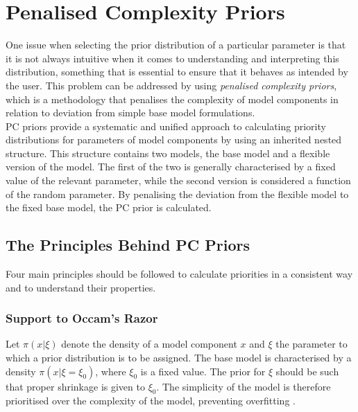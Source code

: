 \section{Penalised Complexity Priors}
One issue when selecting the prior distribution of a particular parameter is that it is not always intuitive when it comes to understanding and interpreting this distribution, something that is essential to ensure that it behaves as intended by the user. This problem can be addressed by using \textit{penalised complexity priors}, which is a methodology that penalises the complexity of model components in relation to deviation from simple base model formulations.\\
PC priors provide a systematic and unified approach to calculating priority distributions for parameters of model components by using an inherited nested structure. This structure contains two models, the base model and a flexible version of the model. The first of the two is generally characterised by a fixed value of the relevant parameter, while the second version is considered a function of the random parameter. By penalising the deviation from the flexible model to the fixed base model, the PC prior is calculated.
\subsection*{The Principles Behind PC Priors}
Four main principles should be followed to calculate priorities in a consistent way and to understand their properties.
\subsubsection*{Support to Occam's Razor} 
Let $\pi\left(x|\xi\right)$ denote the density of a model component $x$ and $\xi$ the parameter to which a prior distribution is to be assigned. The base model is characterised by a density $\pi\left(x|\xi=\xi_0\right)$, where $\xi_0$ is a fixed value. The prior for $\xi$ should be such that proper shrinkage is given to $\xi_0$. The simplicity of the model is therefore prioritised over the complexity of the model, preventing overfitting \autocite[][]{simpson2017penalising}.
